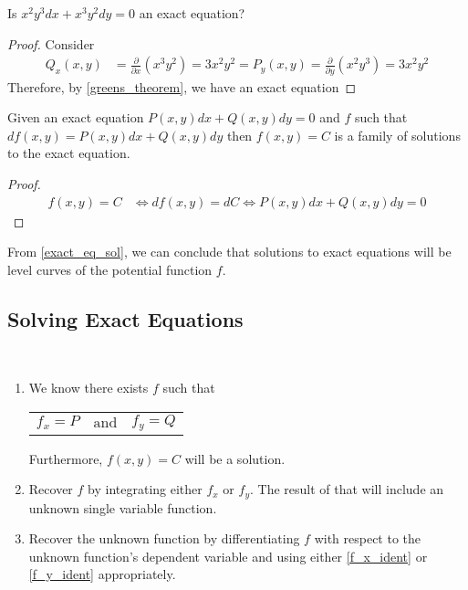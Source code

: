\documentclass[notes]{subfiles}
\begin{document}
\begin{exercise}
    Is $x^2 y^3 dx + x^3 y^2 dy = 0$ an exact equation?
\end{exercise}
\begin{proof}
    Consider
    \begin{align*}
        Q_x(x, y)
        &= \frac{\partial}{\partial x} (x^3 y^2)
        = 3 x^2 y^2
        = P_y(x, y)
        = \frac{\partial}{\partial y} (x^2 y^3)
        = 3 x^2 y^2
    \end{align*}
    Therefore, by \cref{greens_theorem}, we have an exact equation
\end{proof}

\begin{lemma} \label{exact_eq_sol}
    Given an exact equation $P(x, y)dx + Q(x, y)dy = 0$ and $f$ such that $df(x, y) = P(x, y)dx + Q(x, y)dy$ then $f(x, y) = C$ is a family of solutions to the exact equation.
\end{lemma}
\begin{proof}
    \begin{align*}
        f(x, y) = C
        &\iff df(x, y) = dC
        \iff P(x, y)dx + Q(x, y)dy = 0
    \end{align*}
\end{proof}

From \cref{exact_eq_sol}, we can conclude that solutions to exact equations will be level curves of the potential function $f$.

\subsection{Solving Exact Equations}
\begin{procedure} ~\par
    \begin{enumerate}[label=(\arabic*)]
        \item We know there exists $f$ such that \par
        \begin{tabularx}{\linewidth}{X X X}
            \begin{equation} \tag{$1$} \label{f_x_ident}
                f_x = P
            \end{equation}
            & \[ \text{and} \] & %
            \begin{equation} \tag{$2$} \label{f_y_ident}
                f_y = Q
            \end{equation}
        \end{tabularx}
        Furthermore, $f(x, y) = C$ will be a solution.
        \item Recover $f$ by integrating either $f_x$ or $f_y$. The result of that will include an unknown single variable function.
        \item Recover the unknown function by differentiating $f$ with respect to the unknown function's dependent variable and using either \eqref{f_x_ident} or \eqref{f_y_ident} appropriately.
    \end{enumerate}
\end{procedure}
\end{document}
